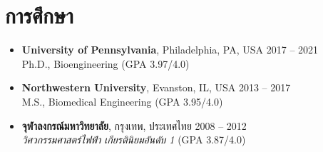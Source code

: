 \section{\sc การศึกษา}

\begin{itemize}[leftmargin=0cm, label={}]

\item {\bf University of Pennsylvania}, Philadelphia, PA, USA \hfill 2017 -- 2021 \\
Ph.D., Bioengineering \hfill (GPA 3.97/4.0)

\item {\bf Northwestern University}, Evanston, IL, USA \hfill 2013 -- 2017 \\
M.S., Biomedical Engineering \hfill (GPA 3.95/4.0)

\item {\bf จุฬาลงกรณ์มหาวิทยาลัย}, กรุงเทพ, ประเทศไทย \hfill 2008 -- 2012 \\
{\em วิศวกรรมศาสตร์ไฟฟ้า เกียรตินิยมอันดับ 1} \hfill (GPA 3.87/4.0)

\end{itemize}
